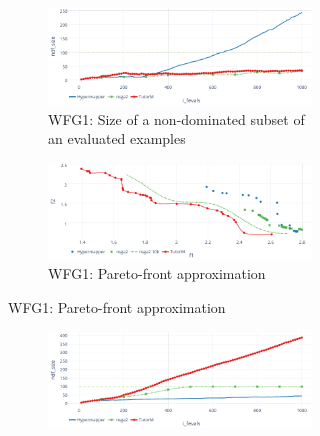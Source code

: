     \begin{figure}
        \centering
        \begin{subfigure}{\textwidth}
            \begin{subfigure}{0.5\textwidth}
                \includegraphics[width=\textwidth]{content/images/wfg1_ndf}
                \caption{WFG1: Size of a non-dominated subset of an evaluated examples}
                \label{fig:wfg1_ndf}
            \end{subfigure} 
            \begin{subfigure}{0.5\textwidth}
                \includegraphics[width=\textwidth]{content/images/wfg1_front}
                \caption{WFG1: Pareto-front approximation}
                \label{fig:wfg1_front}
            \end{subfigure} 
        \end{subfigure} 
        \begin{subfigure}{\textwidth}
            \begin{subfigure}{0.5\textwidth}
                \includegraphics[width=\textwidth]{content/images/wfg4_ndf}

\end{subfigure}
\end{subfigure}
\end{figure}
